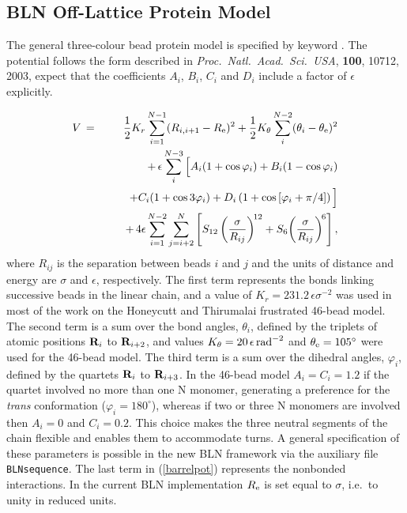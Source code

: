 {\subsection{BLN Off-Lattice Protein Model}
\label{sec:BLN}

The general three-colour bead protein model is specified by keyword {}.
The potential follows the form described in
{\it Proc.~Natl.~Acad.~Sci.~USA}, {\bf 100}, 10712, 2003, expect that
the coefficients $A_i$, $B_i$, $C_i$ and $D_i$ include a factor of $\epsilon$
explicitly.

{\begin{eqnarray}
V&\,=\,&\frac{1}{2} K_r\sum_{i=1}^{N-1}(R_{i,i+1}-R_{\rm e})^2
 +\frac{1}{2} K_\theta\sum_i^{N-2}(\theta_i-\theta_{\rm e})^2 \nonumber\\
 &&+\,\epsilon\sum_i^{N-3}\Big[A_i(1+\cos\varphi_i)+B_i(1-\cos\varphi_i) \nonumber\\
  && \qquad +C_i(1+\cos3\varphi_i)+D_i\left(1+\cos\left[\varphi_i+\pi/4\right]\right)\Big] \nonumber\\
 &&+\,4\epsilon\sum_{i=1}^{N-2}\sum_{j=i+2}^N \left[S_{12}\left(\frac{\sigma}{R_{ij}}\right)^{\!12}
    +S_6\!\left(\frac{\sigma}{R_{ij}}\right)^{\!6}\right],
\label{barrelpot}
\end{eqnarray}}
\noindent where $R_{ij}$ is the separation between beads $i$ and $j$ and
the units of distance and energy are $\sigma$ and $\epsilon$, respectively.
The first term represents the bonds linking successive beads in the linear chain, and a 
value of $K_r=231.2\,\epsilon\sigma^{-2}$ was used in most of the work on the 
Honeycutt and Thirumalai frustrated 46-bead model.
The second term is a sum over the bond angles, $\theta_i$, defined by the triplets
of atomic positions ${\bf R}_i$ to ${\bf R}_{i+2}$, and values
$K_\theta=20\,\epsilon\,{\rm rad}^{-2}$ and $\theta_{\rm e}=105^\circ$ were
used for the 46-bead model.
The third term
is a sum over the dihedral angles, $\varphi_i$, defined by the quartets ${\bf R}_i$ to
${\bf R}_{i+3}$. 
In the 46-bead model $A_i=C_i=1.2$ if the quartet involved no more than one N monomer, generating
a preference for the {\it trans\/} conformation ($\varphi_i=180^\circ$), whereas if two or three
N monomers are involved then $A_i=0$ and $C_i=0.2$.
This choice makes the three neutral
segments of the chain flexible and enables them to accommodate turns.
A general specification of these parameters is possible in the new BLN framework
via the auxiliary file {\tt BLNsequence}.
The last term in (\ref{barrelpot}) represents the nonbonded interactions.
In the current BLN implementation $R_{\rm e}$ is set equal to $\sigma$, i.e.~to 
unity in reduced units.

}
